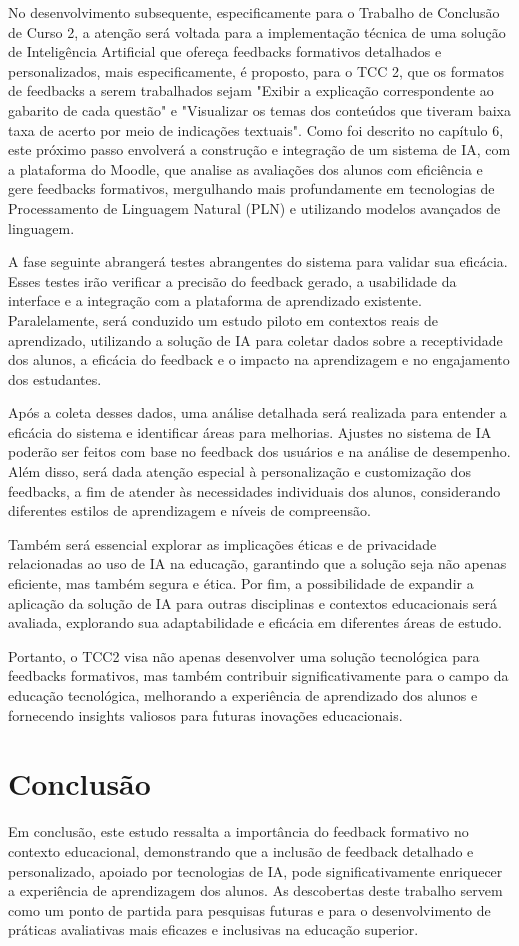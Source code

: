 No desenvolvimento subsequente, especificamente para o Trabalho de Conclusão de Curso 2, a atenção será voltada para a implementação técnica de uma solução de Inteligência Artificial que ofereça feedbacks formativos detalhados e personalizados, mais especificamente, é proposto, para o TCC 2, que os formatos de feedbacks a serem trabalhados sejam "Exibir a explicação correspondente ao gabarito de cada questão" e "Visualizar os temas dos conteúdos que tiveram baixa taxa de acerto por meio de indicações textuais". Como foi descrito no capítulo 6, este próximo passo envolverá a construção e integração de um sistema de IA, com a plataforma do Moodle, que analise as avaliações dos alunos com eficiência e gere feedbacks formativos, mergulhando mais profundamente em tecnologias de Processamento de Linguagem Natural (PLN) e utilizando modelos avançados de linguagem.

A fase seguinte abrangerá testes abrangentes do sistema para validar sua eficácia. Esses testes irão verificar a precisão do feedback gerado, a usabilidade da interface e a integração com a plataforma de aprendizado existente. Paralelamente, será conduzido um estudo piloto em contextos reais de aprendizado, utilizando a solução de IA para coletar dados sobre a receptividade dos alunos, a eficácia do feedback e o impacto na aprendizagem e no engajamento dos estudantes.

Após a coleta desses dados, uma análise detalhada será realizada para entender a eficácia do sistema e identificar áreas para melhorias. Ajustes no sistema de IA poderão ser feitos com base no feedback dos usuários e na análise de desempenho. Além disso, será dada atenção especial à personalização e customização dos feedbacks, a fim de atender às necessidades individuais dos alunos, considerando diferentes estilos de aprendizagem e níveis de compreensão.

Também será essencial explorar as implicações éticas e de privacidade relacionadas ao uso de IA na educação, garantindo que a solução seja não apenas eficiente, mas também segura e ética. Por fim, a possibilidade de expandir a aplicação da solução de IA para outras disciplinas e contextos educacionais será avaliada, explorando sua adaptabilidade e eficácia em diferentes áreas de estudo.

Portanto, o TCC2 visa não apenas desenvolver uma solução tecnológica para feedbacks formativos, mas também contribuir significativamente para o campo da educação tecnológica, melhorando a experiência de aprendizado dos alunos e fornecendo insights valiosos para futuras inovações educacionais.

\section{Conclusão}

Em conclusão, este estudo ressalta a importância do feedback formativo no contexto educacional, demonstrando que a inclusão de feedback detalhado e personalizado, apoiado por tecnologias de IA, pode significativamente enriquecer a experiência de aprendizagem dos alunos. As descobertas deste trabalho servem como um ponto de partida para pesquisas futuras e para o desenvolvimento de práticas avaliativas mais eficazes e inclusivas na educação superior.